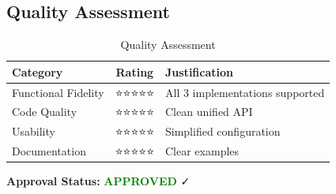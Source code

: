 \subsection{Quality Assessment}

\begin{table}[h]
\centering
\begin{tabular}{|l|c|l|}
\hline
\textbf{Category} & \textbf{Rating} & \textbf{Justification} \\
\hline
Functional Fidelity & ⭐⭐⭐⭐⭐ & All 3 implementations supported \\
Code Quality & ⭐⭐⭐⭐⭐ & Clean unified API \\
Usability & ⭐⭐⭐⭐⭐ & Simplified configuration \\
Documentation & ⭐⭐⭐⭐⭐ & Clear examples \\
\hline
\end{tabular}
\caption{Quality Assessment}
\end{table}

\textbf{Approval Status:} \textcolor{green}{\textbf{APPROVED}} ✓

